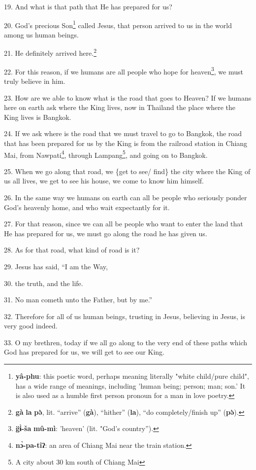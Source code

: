 19. And what is that path that He has prepared for us?

20. God's precious Son\footnote{\textbf{yâ-phu}: this poetic word, perhaps meaning literally "white child/pure child", has a wide range of meanings, including 'human being; person; man; son.' It is also used as a humble first person pronoun for a man in love poetry.} called Jesus, that person arrived to us in the world
among us human beings.

21. He definitely arrived here.\footnote{\textbf{gà} \textbf{la} \textbf{pə̀}, lit. ``arrive'' (\textbf{gà}), ``hither'' (\textbf{la}), ``do completely/finish up'' (\textbf{pə̀}).}

22. For this reason, if we humans are all people who hope for heaven\footnote{\textbf{g̈ɨ̀-ša} \textbf{mû-mì}: 'heaven' (lit. "God's country'').}, we must
truly believe in him.

23. How are we able to know what is the road that goes to Heaven? If we humans
here on earth ask where the King lives, now in Thailand the place where the King
lives is Bangkok.

24. If we ask where is the road that we must travel to go to Bangkok, the road
that has been prepared for us by the King is from the railroad station in Chiang
Mai, from Nawpati\footnote{\textbf{nɔ̀-pa-tîʔ}: an area of Chiang Mai near the train station.}, through Lampang\footnote{A city about 30 km south of Chiang Mai}, and going on to Bangkok.

25. When we go along that road, we \{get to see/ find\} the city where the King
of us all lives, we get to see his house, we come to know him himself.

26. In the same way we humans on earth can all be people who seriously ponder God's
heavenly home, and who wait expectantly for it.

27. For that reason, since we can all be people who want to enter the land that
He has prepared for us, we must go along the road he has given us.

28. As for that road, what kind of road is it?

29. Jesus has said, ``I am the Way,

30. the truth, and the life.

31. No man cometh unto the Father, but by me.''

32. Therefore for all of us human beings, trusting in Jesus, believing in Jesus,
is very good indeed.

33. O my brethren, today if we all go along to the very end of these paths which
God has prepared for us, we will get to see our King.

